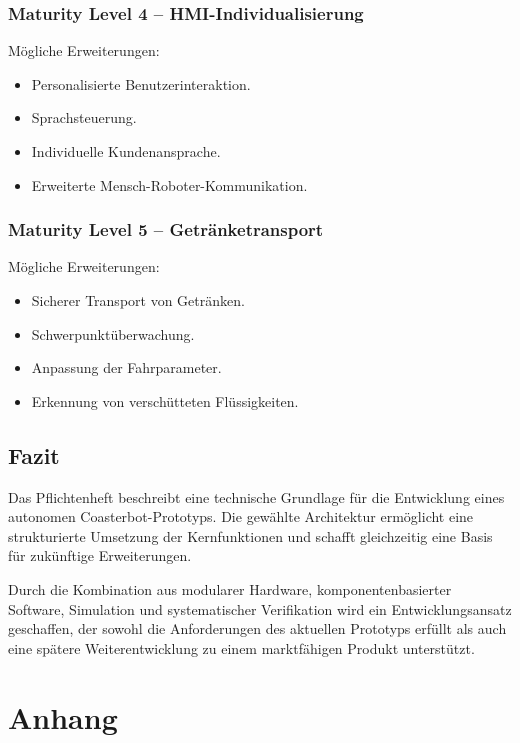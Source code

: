 \documentclass[
  a4paper,
  12pt,
  DIV=12,        %
  parskip=half,  %
  headings=small %
]{scrartcl}
\theoremstyle{definition}
\providecommand{\tightlist}{%
  \setlength{\itemsep}{0pt}\setlength{\parskip}{0pt}}
\theoremstyle{definition}
\begin{document}
\subsubsection{Maturity Level 4 --
HMI-Individualisierung}\label{maturity-level-4-hmi-individualisierung}

Mögliche Erweiterungen:

\begin{itemize}
\tightlist
\item
  Personalisierte Benutzerinteraktion.
\item
  Sprachsteuerung.
\item
  Individuelle Kundenansprache.
\item
  Erweiterte Mensch-Roboter-Kommunikation.
\end{itemize}

\subsubsection{Maturity Level 5 --
Getränketransport}\label{maturity-level-5-getruxe4nketransport}

Mögliche Erweiterungen:

\begin{itemize}
\tightlist
\item
  Sicherer Transport von Getränken.
\item
  Schwerpunktüberwachung.
\item
  Anpassung der Fahrparameter.
\item
  Erkennung von verschütteten Flüssigkeiten.
\end{itemize}

\subsection{Fazit}\label{fazit}

Das Pflichtenheft beschreibt eine technische Grundlage für die
Entwicklung eines autonomen Coasterbot-Prototyps. Die gewählte
Architektur ermöglicht eine strukturierte Umsetzung der Kernfunktionen
und schafft gleichzeitig eine Basis für zukünftige Erweiterungen.

Durch die Kombination aus modularer Hardware, komponentenbasierter
Software, Simulation und systematischer Verifikation wird ein
Entwicklungsansatz geschaffen, der sowohl die Anforderungen des
aktuellen Prototyps erfüllt als auch eine spätere Weiterentwicklung zu
einem marktfähigen Produkt unterstützt.

\section{Anhang}\label{anhang}
\end{document}
